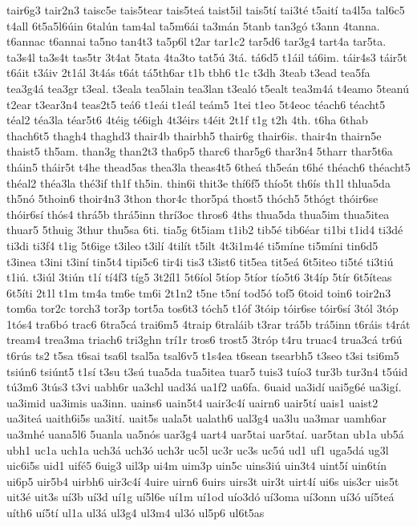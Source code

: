 {tair6g3
tair2n3
taisc5e
tais5tear
tais5teá
taist5il
tais5tí
tai3té
t5aití
ta4l5a
tal6c5
t4all
6t5a5l6úin
6talún
tam4al
ta5m6ái
ta3mán
5tanb
tan3gó
t3ann
4tanna.
t6annac
t6annai
ta5no
tan4t3
ta5p6l
t2ar
tar1c2
tar5d6
tar3g4
tart4a
tar5ta.
ta3s4l
ta3s4t
tas5tr
3t4at
5tata
4ta3to
tat5ú
3tá.
tá6d5
t1áil
tá6im.
táir4s3
táir5t
t6áit
t3áiv
2t1ál
3t4ás
t6át
tá5th6ar
t1b
tbh6
t1c
t3dh
3teab
t3ead
tea5fa
tea3g4á
tea3gr
t3eal.
t3eala
tea5lain
tea3lan
t3ealó
t5ealt
tea3m4á
t4eamo
5teanú
t2ear
t3ear3n4
teas2t5
teá6
t1eái
t1eál
teám5
1tei
t1eo
5t4eoc
téach6
téacht5
téal2
téa3la
téar5t6
4téig
té6igh
4t3éirs
t4éit
2t1f
t1g
t2h
4th.
t6ha
6thab
thach6t5
thagh4
thaghd3
thair4b
thairbh5
thair6g
thair6is.
thair4n
thairn5e
thaist5
th5am.
than3g
than2t3
tha6p5
tharc6
thar5g6
thar3n4
5tharr
thar5t6a
tháin5
tháir5t
t4he
thead5as
thea3la
theas4t5
6theá
th5eán
t6hé
théach6
théacht5
théal2
théa3la
thé3if
th1f
th5in.
thin6i
thit3e
thí6f5
thío5t
th6ís
th1l
thlua5da
th5nó
5thoin6
thoir4n3
3thon
thor4c
thor5pá
thost5
thóch5
5thógt
thóir6se
thóir6sí
thós4
thrá5b
thrá5inn
thrí3oc
thros6
4ths
thua5da
thua5im
thua5itea
thuar5
5thuig
3thur
thu5sa
6ti.
tia5g
6t5iam
t1ib2
tib5é
tib6éar
ti1bi
t1id4
ti3dé
ti3di
ti3f4
t1ig
5t6ige
t3ileo
t3ilí
4tilít
t5ilt
4t3i1m4é
ti5míne
ti5míni
tin6d5
t3inea
t3ini
t3iní
tin5t4
tipi5c6
tir4i
tis3
t3ist6
tit5ea
tit5eá
6t5iteo
ti5té
ti3tiú
t1iú.
t3iúl
3tiún
t1í
tí4f3
tíg5
3t2íl1
5t6íol
5tíop
5tíor
tío5t6
3t4íp
5tír
6t5íteas
6t5íti
2t1l
t1m
tm4a
tm6e
tm6i
2t1n2
t5ne
t5ní
tod5ó
tof5
6toid
toin6
toir2n3
tom6a
tor2c
torch3
tor3p
tort5a
tos6t3
tóch5
t1óf
3tóip
tóir6se
tóir6sí
3tól
3tóp
1tós4
tra6bó
trac6
6tra5cá
trai6m5
4traip
6traláib
t3rar
trá5b
trá5inn
t6ráis
t4rát
tream4
trea3ma
triach6
tri3ghn
trí1r
tros6
trost5
3tróp
t4ru
truac4
trua3cá
tr6ú
t6rús
ts2
t5sa
t6sai
tsa6l
tsal5a
tsal6v5
t1s4ea
t6sean
tsearbh5
t3seo
t3si
tsi6m5
tsiún6
tsiúnt5
t1sí
t3su
t3sú
tua5da
tua5itea
tuar5
tuis3
tuío3
tur3b
tur3n4
t5úid
tú3m6
3tús3
t3vi
uabh6r
ua3chl
uad3á
ua1f2
ua6fa.
6uaid
ua3idí
uai5g6é
ua3igí.
ua3imid
ua3imis
ua3inn.
uains6
uain5t4
uair3c4í
uairn6
uair5tí
uais1
uaist2
ua3iteá
uaith6i5s
ua3ití.
uait5s
uala5t
ualath6
ual3g4
ua3lu
ua3mar
uamh6ar
ua3mhé
uana5l6
5uanla
ua5nós
uar3g4
uart4
uar5tai
uar5taí.
uar5tan
ub1a
ub5á
ubh1
uc1a
uch1a
uch3á
uch3ó
uch3r
uc5l
uc3r
uc3s
uc5ú
ud1
uf1
uga5dá
ug3l
uic6i5s
uid1
uifé5
6uig3
uil3p
ui4m
uim3p
uin5c
uins3iú
uin3t4
uint5í
uin6tín
ui6p5
uir5b4
uirbh6
uir3c4í
4uire
uirn6
6uirs
uirs3t
uir3t
uirt4í
ui6s
uis3cr
uis5t
uit3é
uit3s
uí3b
uí3d
uí1g
uí5l6e
uí1m
uí1od
uío3dó
uí3oma
uí3onn
uí3ó
uí5teá
uíth6
uí5tí
ul1a
ul3á
ul3g4
ul3m4
ul3ó
ul5p6
ul6t5as
}
